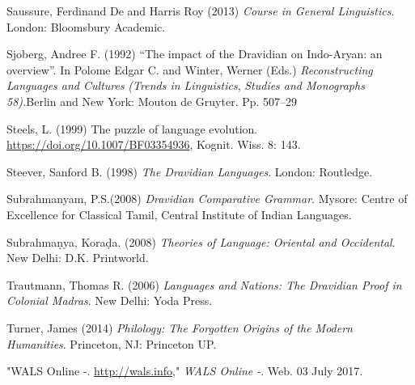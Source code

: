 \begin{thebibliography}{99}
  Saussure, Ferdinand De and Harris Roy (2013) \textit{Course in General Linguistics}. London: Bloomsbury Academic.

  Sjoberg, Andree F. (1992) “The impact of the Dravidian on Indo-Aryan: an overview”. In Polome Edgar C. and Winter, Werner (Eds.) \textit{Reconstructing Languages and Cultures} \textit{(Trends in Linguistics}, \textit{Studies and Monographs 58).}Berlin and New York: Mouton de Gruyter. Pp. 507–29

  Steels, L. (1999) The puzzle of language evolution. \url{ https://doi.org/10.1007/BF03354936}, Kognit. Wiss. 8: 143.

  Steever, Sanford B. (1998) \textit{The Dravidian Languages}. London: Routledge.

  Subrahmanyam, P.S.(2008) \textit{Dravidian Comparative Grammar}. Mysore: Centre of Excellence for Classical Tamil, Central Institute of Indian Languages.

  Subrahmaṇya, Koraḍa. (2008) \textit{Theories of Language: Oriental and Occidental}. New Delhi: D.K. Printworld.

  Trautmann, Thomas R. (2006) \textit{Languages and Nations: The Dravidian Proof in Colonial Madras}. New Delhi: Yoda Press.

  Turner, James (2014) \textit{Philology: The Forgotten Origins of the Modern Humanities}. Princeton, NJ: Princeton UP.

  "WALS Online -. \url{http://wals.info}," \textit{WALS Online -}. Web. 03 July 2017.

 \end{thebibliography}

\theendnotes

